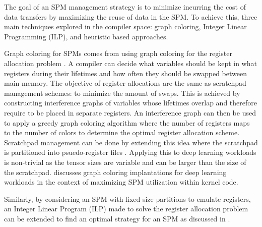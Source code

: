 The goal of an SPM management strategy is to minimize incurring the cost of
data transfers by maximizing the reuse of data in the SPM. To achieve this,
three main techniques explored in the compiler space: graph coloring, Integer
Linear Programming (ILP), and heuristic based approaches.

Graph coloring for SPMs comes from using graph coloring for the register
allocation problem \cite{registerAllocation} \cite{graphColoring}.  A compiler
can decide what variables should be kept in what registers during their
lifetimes and how often they should be swapped between main memory.  The
objective of register allocations are the same as scratchpad management
schemes: to minimize the amount of swaps. This is achieved by constructing
interference graphs of variables whose lifetimes overlap and therefore require
to be placed in separate registers. An interference graph can then be used to
apply a greedy graph coloring algorithm where the number of registers maps to
the number of colors to determine the optimal register allocation scheme.
Scratchpad management can be done by extending this idea where the scratchpad
is partitioned into psuedo-register files \cite{graphColoring}. Applying this
to deep learning workloads is non-trivial as the tensor sizes are variable and
can be larger than the size of the scratchpad. \cite{toplib} discusses graph
coloring implantations for deep learning workloads in the context of maximizing
SPM utilization within kernel code.

Similarly, by considering an SPM with fixed size partitions to emulate registers,
an Integer Linear Program (ILP) made to solve the register allocation problem can
be extended to find an optimal strategy for an SPM as discussed in \cite{verma}.


